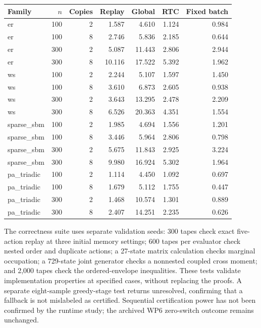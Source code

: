 \documentclass[preprint,11pt,sort&compress]{elsarticle}
\begin{document}
{\footnotesize\setlength{\tabcolsep}{4pt}
\begin{longtable}{lrrrrrr}
\toprule Family & $n$ & Copies & Replay & Global & RTC & Fixed batch\\\midrule\endhead
er & 100 & 2 & 1.587 & 4.610 & 1.124 & 0.984\\
er & 100 & 8 & 2.746 & 5.836 & 2.185 & 0.644\\
er & 300 & 2 & 5.087 & 11.443 & 2.806 & 2.944\\
er & 300 & 8 & 10.116 & 17.522 & 5.392 & 1.962\\
ws & 100 & 2 & 2.244 & 5.107 & 1.597 & 1.450\\
ws & 100 & 8 & 3.610 & 6.873 & 2.605 & 0.938\\
ws & 300 & 2 & 3.643 & 13.295 & 2.478 & 2.209\\
ws & 300 & 8 & 6.526 & 20.363 & 4.351 & 1.554\\
sparse\_sbm & 100 & 2 & 1.985 & 4.694 & 1.556 & 1.201\\
sparse\_sbm & 100 & 8 & 3.446 & 5.964 & 2.806 & 0.798\\
sparse\_sbm & 300 & 2 & 5.675 & 11.843 & 2.925 & 3.224\\
sparse\_sbm & 300 & 8 & 9.980 & 16.924 & 5.302 & 1.964\\
pa\_triadic & 100 & 2 & 1.114 & 4.450 & 1.092 & 0.697\\
pa\_triadic & 100 & 8 & 1.679 & 5.112 & 1.755 & 0.447\\
pa\_triadic & 300 & 2 & 1.468 & 10.574 & 1.301 & 0.889\\
pa\_triadic & 300 & 8 & 2.407 & 14.251 & 2.235 & 0.626\\
\bottomrule\end{longtable}}

The correctness suite uses separate validation seeds: 300 tapes check exact five-action replay at three initial memory settings; 600 tapes per evaluator check nested order and duplicate actions; a 27-state matrix calculation checks marginal occupation; a 729-state joint generator checks a nonnested coupled cross moment; and 2,000 tapes check the ordered-envelope inequalities. These tests validate implementation properties at specified cases, without replacing the proofs. A separate eight-sample greedy-stage test returns unresolved, confirming that a fallback is not mislabeled as certified. Sequential certification power has not been confirmed by the runtime study; the archived WP6 zero-switch outcome remains unchanged.
\end{document}
